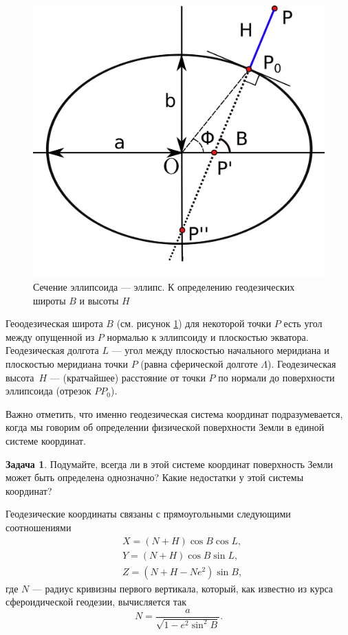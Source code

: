 \documentclass[11pt, a4paper]{article}
\theoremstyle{plain}
\theoremstyle{definition}
\newtheorem{problem}{Задача}[section]
\theoremstyle{remark}
\begin{document}
\begin{figure}[h]
    \centering
    \includegraphics{fig/GeodeticHLat}
    \caption{Сечение эллипсоида --- эллипс. К определению геодезических широты $B$ и высоты $H$}
    \label{fig:GeodeticHLat}
\end{figure}
Геоодезическая широта $B$ (см. рисунок \ref{fig:GeodeticHLat}) для некоторой точки $P$ есть угол между опущенной из $P$ нормалью к эллипсоиду и плоскостью
экватора. Геодезическая долгота $L$ --- угол между плоскостью начального меридиана и плоскостью
меридиана точки $P$ (равна сферической долготе $\Lambda$). Геодезическая высота~$H$ --- (кратчайшее) 
расстояние от точки $P$ по нормали до поверхности эллипсоида (отрезок $PP_0$).

Важно отметить, что именно геодезическая система координат подразумевается, когда мы говорим
об определении физической поверхности Земли в единой системе координат. 
\begin{problem}
Подумайте, всегда ли в этой
системе координат поверхность Земли может быть определена однозначно? Какие недостатки у этой
системы координат?
\end{problem}

Геодезические координаты связаны с прямоугольными следующими соотношениями
\begin{align*}
    &X = \left( N + H \right)\cos{B}\cos{L},\\
    &Y = \left( N + H \right)\cos{B}\sin{L},\\
    &Z = \left( N + H - Ne^2 \right)\sin{B},
\end{align*}
где $N$ --- радиус кривизны первого вертикала, который, как известно из курса сфероидической
геодезии, вычисляется так
\begin{equation*}
    N = \frac{a}{\sqrt{1 - e^2\sin^2{B}}}.
\end{equation*}
\end{document}
